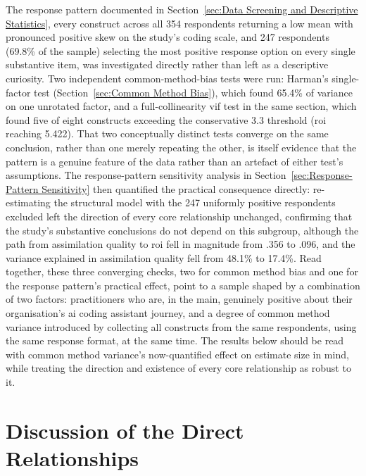 The response pattern documented in Section~\ref{sec:Data Screening and Descriptive Statistics}, every construct across all 354 respondents returning a low mean with pronounced positive skew on the study's coding scale, and 247 respondents (69.8\% of the sample) selecting the most positive response option on every single substantive item, was investigated directly rather than left as a descriptive curiosity. Two independent common-method-bias tests were run: Harman's single-factor test (Section~\ref{sec:Common Method Bias}), which found 65.4\% of variance on one unrotated factor, and a full-collinearity \gls{vif} test in the same section, which found five of eight constructs exceeding the conservative 3.3 threshold (\gls{roi} reaching 5.422). That two conceptually distinct tests converge on the same conclusion, rather than one merely repeating the other, is itself evidence that the pattern is a genuine feature of the data rather than an artefact of either test's assumptions. The response-pattern sensitivity analysis in Section~\ref{sec:Response-Pattern Sensitivity} then quantified the practical consequence directly: re-estimating the structural model with the 247 uniformly positive respondents excluded left the direction of every core relationship unchanged, confirming that the study's substantive conclusions do not depend on this subgroup, although the path from assimilation quality to \gls{roi} fell in magnitude from .356 to .096, and the variance explained in assimilation quality fell from 48.1\% to 17.4\%. Read together, these three converging checks, two for common method bias and one for the response pattern's practical effect, point to a sample shaped by a combination of two factors: practitioners who are, in the main, genuinely positive about their organisation's \gls{ai} coding assistant journey, and a degree of common method variance introduced by collecting all constructs from the same respondents, using the same response format, at the same time. The results below should be read with common method variance's now-quantified effect on estimate size in mind, while treating the direction and existence of every core relationship as robust to it.

\section{Discussion of the Direct Relationships}
\label{sec:Discussion of Direct Effects}

